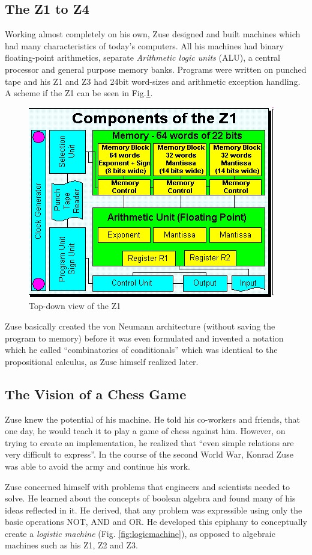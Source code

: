 \documentclass{llncs}
\begin{document}
 \subsection{The Z1 to Z4}
   Working almost completely on his own, Zuse designed and built machines 
   which had many characteristics of today's computers. All his machines
   had binary floating-point arithmetics, separate \emph{Arithmetic logic units} (ALU), 
   a central processor and general purpose memory banks.
   Programs were written on punched tape and his Z1 and Z3 had 24bit word-sizes
   and arithmetic exception handling. A scheme if the Z1 can be seen in Fig.\ref{fig:z1}.
   
  \begin{figure}[t]
    \centering
    \includegraphics[width=0.5\linewidth]{img/z1.png}
    \caption{Top-down view of the Z1\cite{epegmagHorstzuse}}
    \label{fig:z1}
  \end{figure}

   Zuse basically created the von Neumann architecture (without saving the program to memory)
   before it was even formulated\cite{epegmagHorstzuse} 
   and invented a notation which he called ``combinatorics of conditionals'' which was
   identical to the propositional calculus, as Zuse himself realized later.
 \subsection{The Vision of a Chess Game}
   Zuse knew the potential of his machine. He told his co-workers and 
   friends, that one day, he would teach it to play a game of chess 
   against him. However, on trying to create an implementation, he realized 
   that ``even simple relations are very difficult to express''. In the course
   of the second World War, Konrad Zuse was able to avoid the army and 
   continue his work. 
   
   Zuse concerned himself with problems that engineers and scientists needed to 
   solve. He learned about the concepts of boolean algebra and found many 
   of his ideas reflected in it. He derived, that any problem was expressible
   using only the basic operations NOT, AND and OR. He developed this epiphany 
   to conceptually create a \emph{logistic machine} (Fig. \ref{fig:logicmachine}), 
   as opposed to algebraic machines such as his Z1, Z2 and Z3\cite{epegmagHorstzuse}.
   
\end{document}
